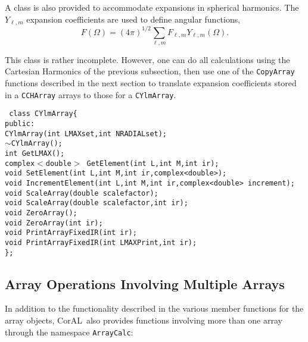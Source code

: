 \documentclass[10pt]{article}
\def\tab{\hspace*{9pt}}
\newcommand{\coral}{CorAL}
\begin{document}
A class is also provided to accommodate expansions in spherical harmonics. The $Y_{\ell,m}$ expansion coefficients are used to define angular functions,
\begin{equation}
F(\Omega)=(4\pi)^{1/2}\sum_{\ell,m}F_{\ell,m}Y_{\ell,m}(\Omega).
\end{equation}

This class is rather incomplete. However, one can do all calculations using the Cartesian Harmonics of the previous subsection, then use one of the {\tt CopyArray} functions described in the next section to translate expansion coefficients stored in a {\tt CCHArray} arrays to those for a {\tt CYlmArray}.

{\tt
class CYlmArray\{\\
\tab public:\\
\tab \tab  CYlmArray(int LMAXset,int NRADIALset);\\
\tab \tab  $\sim$CYlmArray();\\
\tab \tab  int GetLMAX();\\
\tab \tab  complex$<$double$>$ GetElement(int L,int M,int ir);\\
\tab \tab  void SetElement(int L,int M,int ir,complex<double>);\\
\tab \tab  void IncrementElement(int L,int M,int ir,complex<double> increment);\\
\tab \tab  void ScaleArray(double scalefactor);\\
\tab \tab  void ScaleArray(double scalefactor,int ir);\\
\tab \tab  void ZeroArray();\\
\tab \tab  void ZeroArray(int ir);\\
\tab \tab  void PrintArrayFixedIR(int ir);\\
\tab \tab  void PrintArrayFixedIR(int LMAXPrint,int ir);\\
\};\\ }

\subsection{Array Operations Involving Multiple Arrays}

In addition to the functionality described in the various member functions for the array objects, \coral\ also provides functions involving more than one array through the namespace {\tt ArrayCalc}:
\end{document}
